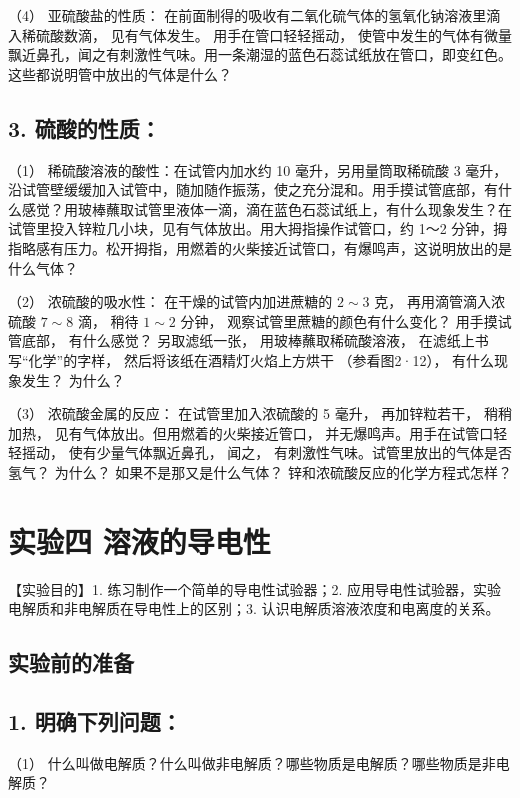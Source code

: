 （4） 亚硫酸盐的性质：
在前面制得的吸收有二氧化硫气体的氢氧化钠溶液里滴入稀硫酸数滴，
见有气体发生。 用手在管口轻轻摇动，
使管中发生的气体有微量飘近鼻孔，闻之有刺激性气味。用一条潮湿的蓝色石蕊试纸放在管口，即变红色。这些都说明管中放出的气体是什么？

\subsection{3. 硫酸的性质：}

（1） 稀硫酸溶液的酸性：在试管内加水约 10 毫升，另用量筒取稀硫酸 3
毫升，沿试管壁缓缓加入试管中，随加随作振荡，使之充分混和。用手摸试管底部，有什么感觉？用玻棒蘸取试管里液体一滴，滴在蓝色石蕊试纸上，有什么现象发生？在试管里投入锌粒几小块，见有气体放出。用大拇指操作试管口，约
1～2
分钟，拇指略感有压力。松开拇指，用燃着的火柴接近试管口，有爆鸣声，这说明放出的是什么气体？

（2） 浓硫酸的吸水性： 在干燥的试管内加进蔗糖的 \(2 \sim 3\) 克，
再用滴管滴入浓硫酸 \(7 \sim 8\) 滴， 稍待 \(1 \sim 2\) 分钟，
观察试管里蔗糖的颜色有什么变化？ 用手摸试管底部， 有什么感觉？
另取滤纸一张， 用玻棒蘸取稀硫酸溶液， 在滤纸上书写``化学''的字样，
然后将该纸在酒精灯火焰上方烘干 （参看图2·12）， 有什么现象发生？
为什么？

（3） 浓硫酸金属的反应： 在试管里加入浓硫酸的 5 毫升， 再加锌粒若干，
稍稍加热， 见有气体放出。但用燃着的火柴接近管口，
并无爆鸣声。用手在试管口轻轻摇动， 使有少量气体飘近鼻孔， 闻之，
有刺激性气味。试管里放出的气体是否氢气？ 为什么？
如果不是那又是什么气体？ 锌和浓硫酸反应的化学方程式怎样？

\section{实验四 溶液的导电性}

【实验目的】1. 练习制作一个简单的导电性试验器；2.
应用导电性试验器，实验电解质和非电解质在导电性上的区别；3.
认识电解质溶液浓度和电离度的关系。

\subsection{实验前的准备}

\subsection{1. 明确下列问题：}

（1）
什么叫做电解质？什么叫做非电解质？哪些物质是电解质？哪些物质是非电解质？

